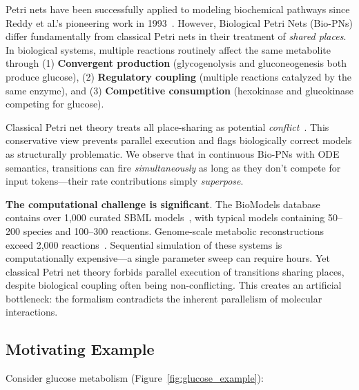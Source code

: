 \documentclass[twocolumn,11pt]{article}
\begin{document}
Petri nets have been successfully applied to modeling biochemical pathways since Reddy et al.'s pioneering work in 1993~\cite{Reddy1993}. However, Biological Petri Nets (Bio-PNs) differ fundamentally from classical Petri nets in their treatment of \emph{shared places}. In biological systems, multiple reactions routinely affect the same metabolite through (1) \textbf{Convergent production} (glycogenolysis and gluconeogenesis both produce glucose), (2) \textbf{Regulatory coupling} (multiple reactions catalyzed by the same enzyme), and (3) \textbf{Competitive consumption} (hexokinase and glucokinase competing for glucose).

Classical Petri net theory treats all place-sharing as potential \emph{conflict}~\cite{Reisig2013}. This conservative view prevents parallel execution and flags biologically correct models as structurally problematic. We observe that in continuous Bio-PNs with ODE semantics, transitions can fire \emph{simultaneously} as long as they don't compete for input tokens---their rate contributions simply \emph{superpose}.

\textbf{The computational challenge is significant}. The BioModels database contains over 1,000 curated SBML models~\cite{Malik2020}, with typical models containing 50--200 species and 100--300 reactions. Genome-scale metabolic reconstructions exceed 2,000 reactions~\cite{Orth2011}. Sequential simulation of these systems is computationally expensive---a single parameter sweep can require hours. Yet classical Petri net theory forbids parallel execution of transitions sharing places, despite biological coupling often being non-conflicting. This creates an artificial bottleneck: the formalism contradicts the inherent parallelism of molecular interactions.

\subsection{Motivating Example}

Consider glucose metabolism (Figure~\ref{fig:glucose_example}):
\end{document}
